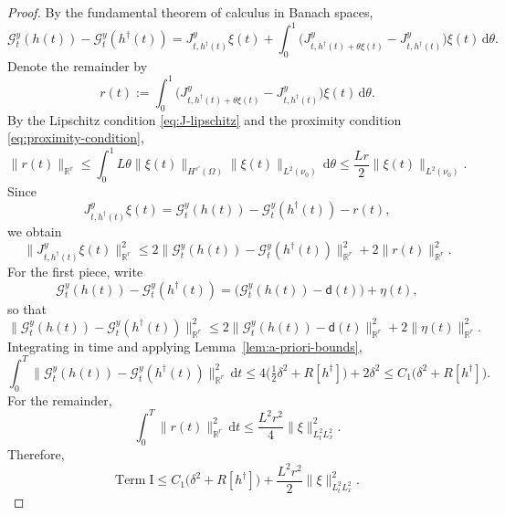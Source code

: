 \documentclass{article}
\theoremstyle{definition}
\renewcommand{\d}{\mathrm{d}}
\newcommand{\obsdata}{\mathsf{d}}
\begin{document}
\begin{proof}
    By the fundamental theorem of calculus in Banach spaces,
    \[
        \mathcal G_t^y(h(t))-\mathcal G_t^y(h^\dagger(t))
        =
        J_{t,h^\dagger(t)}^{y}\xi(t)
        +
        \int_0^1
        \bigl(J_{t,h^\dagger(t)+\theta\xi(t)}^{y}-J_{t,h^\dagger(t)}^{y}\bigr)\xi(t)\,\d\theta.
    \]
    Denote the remainder by
    \[
        r(t)
        :=
        \int_0^1
        \bigl(J_{t,h^\dagger(t)+\theta\xi(t)}^{y}-J_{t,h^\dagger(t)}^{y}\bigr)\xi(t)\,\d\theta.
    \]
    By the Lipschitz condition \eqref{eq:J-lipschitz} and the proximity condition
    \eqref{eq:proximity-condition},
    \[
        \|r(t)\|_{\mathbb R^r}
        \le
        \int_0^1
        L\theta\|\xi(t)\|_{H^{s'}(\Omega)}\|\xi(t)\|_{L^2(\nu_0)}\,\d\theta
        \le
        \frac{Lr}{2}\|\xi(t)\|_{L^2(\nu_0)}.
    \]
    Since
    \[
        J_{t,h^\dagger(t)}^{y}\xi(t)
        =
        \mathcal G_t^y(h(t))-\mathcal G_t^y(h^\dagger(t))-r(t),
    \]
    we obtain
    \[
        \|J_{t,h^\dagger(t)}^{y}\xi(t)\|_{\mathbb R^r}^2
        \le
        2\|\mathcal G_t^y(h(t))-\mathcal G_t^y(h^\dagger(t))\|_{\mathbb R^r}^2
        +
        2\|r(t)\|_{\mathbb R^r}^2.
    \]
    For the first piece, write
    \[
        \mathcal G_t^y(h(t))-\mathcal G_t^y(h^\dagger(t))
        =
        \bigl(\mathcal G_t^y(h(t))-\obsdata(t)\bigr)+\eta(t),
    \]
    so that
    \[
        \|\mathcal G_t^y(h(t))-\mathcal G_t^y(h^\dagger(t))\|_{\mathbb R^r}^2
        \le
        2\|\mathcal G_t^y(h(t))-\obsdata(t)\|_{\mathbb R^r}^2+2\|\eta(t)\|_{\mathbb R^r}^2.
    \]
    Integrating in time and applying Lemma~\ref{lem:a-priori-bounds},
    \[
        \int_0^T \|\mathcal G_t^y(h(t))-\mathcal G_t^y(h^\dagger(t))\|_{\mathbb R^r}^2\,\d t
        \le
        4\bigl(\tfrac12\delta^2+R[h^\dagger]\bigr)+2\delta^2
        \le
        C_1\bigl(\delta^2+R[h^\dagger]\bigr).
    \]
    For the remainder,
    \[
        \int_0^T \|r(t)\|_{\mathbb R^r}^2\,\d t
        \le
        \frac{L^2 r^2}{4}\|\xi\|_{L^2_tL^2_x}^2.
    \]
    Therefore,
    \begin{equation}
        \label{eq:stab-term-I-bound}
        \mathrm{Term\;I}
        \le
        C_1\bigl(\delta^2+R[h^\dagger]\bigr)
        +
        \frac{L^2 r^2}{2}\|\xi\|_{L^2_tL^2_x}^2.
    \end{equation}


\end{proof}
\end{document}
